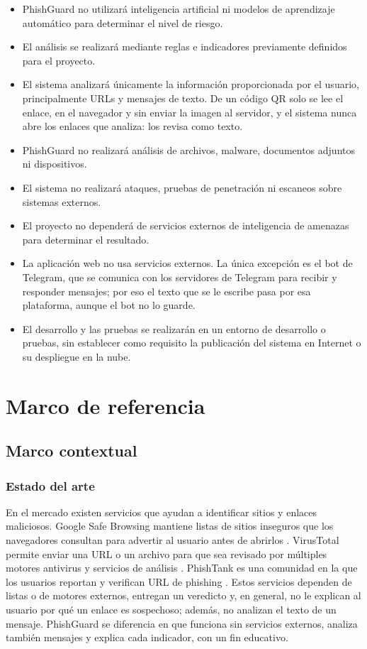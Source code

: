 \documentclass[journal,onecolumn,12pt,draftclsnofoot]{IEEEtran}
\begin{document}
\begin{itemize}
  \item PhishGuard no utilizará inteligencia artificial ni modelos de aprendizaje automático para determinar el nivel de riesgo.
  \item El análisis se realizará mediante reglas e indicadores previamente definidos para el proyecto.
  \item El sistema analizará únicamente la información proporcionada por el usuario, principalmente URLs y mensajes de texto. De un código QR solo se lee el enlace, en el navegador y sin enviar la imagen al servidor, y el sistema nunca abre los enlaces que analiza: los revisa como texto.
  \item PhishGuard no realizará análisis de archivos, malware, documentos adjuntos ni dispositivos.
  \item El sistema no realizará ataques, pruebas de penetración ni escaneos sobre sistemas externos.
  \item El proyecto no dependerá de servicios externos de inteligencia de amenazas para determinar el resultado.
  \item La aplicación web no usa servicios externos. La única excepción es el bot de Telegram, que se comunica con los servidores de Telegram para recibir y responder mensajes; por eso el texto que se le escribe pasa por esa plataforma, aunque el bot no lo guarde.
  \item El desarrollo y las pruebas se realizarán en un entorno de desarrollo o pruebas, sin establecer como requisito la publicación del sistema en Internet o su despliegue en la nube.
\end{itemize}

\section{Marco de referencia}

\subsection{Marco contextual}

\subsubsection{Estado del arte}\label{sec:estado}

En el mercado existen servicios que ayudan a identificar sitios y enlaces maliciosos. Google Safe Browsing mantiene listas de sitios inseguros que los navegadores consultan para advertir al usuario antes de abrirlos \cite{safebrowsing}. VirusTotal permite enviar una URL o un archivo para que sea revisado por múltiples motores antivirus y servicios de análisis \cite{virustotal}. PhishTank es una comunidad en la que los usuarios reportan y verifican URL de phishing \cite{phishtank}. Estos servicios dependen de listas o de motores externos, entregan un veredicto y, en general, no le explican al usuario por qué un enlace es sospechoso; además, no analizan el texto de un mensaje. PhishGuard se diferencia en que funciona sin servicios externos, analiza también mensajes y explica cada indicador, con un fin educativo.
\end{document}

